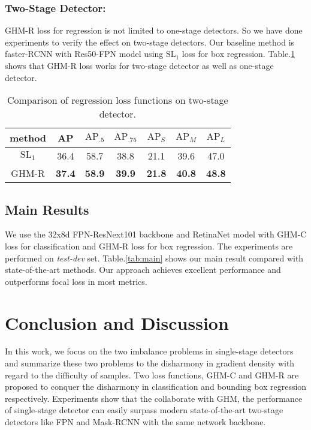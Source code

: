 \documentclass[letterpaper]{article} \usepackage{aaai19}  \usepackage{times}  \usepackage{helvet}  \usepackage{courier}  \usepackage{url}  \usepackage{graphicx}  \usepackage{amsmath,amssymb}
\begin{document}
\subsubsection{Two-Stage Detector:}  GHM-R loss for regression is not limited to one-stage detectors. So we have done experiments to verify the effect on two-stage detectors. Our baseline method is faster-RCNN with Res50-FPN model using $\text{SL}_1$ loss for box regression. Table.\ref{tab:reg2} shows that  GHM-R loss works for two-stage detector as well as one-stage detector.
\begin{table}[!ht]
\begin{center}
\begin{tabular}{| c | c  c  c  c  c  c |}
\hline
method & AP & $\text{AP}_{.5}$ & $\text{AP}_{.75}$ & $\text{AP}_{S}$ & $\text{AP}_{M}$ & $\text{AP}_{L}$ \\
\hline
$\text{SL}_1$ & 36.4 & 58.7 & 38.8 & 21.1 & 39.6 & 47.0 \\
GHM-R & \textbf{37.4} & \textbf{58.9} & \textbf{39.9} & \textbf{21.8} & \textbf{40.8} & \textbf{48.8} \\
\hline
\end{tabular}
\caption{Comparison of regression loss functions on two-stage detector.}
\label{tab:reg2}
\end{center}
\end{table}


\subsection{Main Results}
We use the 32x8d FPN-ResNext101 backbone and RetinaNet model with  GHM-C loss for classification and GHM-R loss for box regression. The experiments are performed on \textit{test-dev} set. Table.\ref{tab:main} shows our main result compared with state-of-the-art methods. Our approach achieves excellent performance and outperforms focal loss in most metrics.



\section{Conclusion and Discussion}
In this work, we focus on the two imbalance problems in single-stage detectors and summarize these two problems to the disharmony in gradient density with regard to the difficulty of samples. Two loss functions, GHM-C and GHM-R are proposed to conquer the disharmony in classification and bounding box regression respectively. Experiments show that the collaborate with GHM, the performance of single-stage detector can easily surpass modern state-of-the-art two-stage detectors like FPN and Mask-RCNN with the same network backbone.
\end{document}
